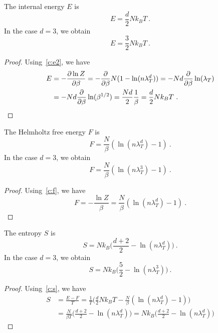     The internal energy $E$ is 
    \begin{equation*}
        E = \frac{d}{2} N k_B T ~.
    \end{equation*}
    In the case $d=3$, we obtain 
    \begin{equation*}
        E = \frac{3}{2} N k_B T ~.
    \end{equation*}
    \begin{proof}
        Using~\eqref{c:e2}, we have
        \begin{equation*}
        \begin{aligned}
            E & = - \frac{\partial\ln Z}{\partial\beta}  = - \frac{\partial}{\partial\beta} N (1 - \ln (n \lambda_T^d)) = - Nd \frac{\partial}{\partial\beta} \ln (\lambda_T) \\ & = - Nd \frac{\partial}{\partial\beta} \ln (\beta^{1/2}) = \frac{Nd}{2} \frac{1}{\beta} = \frac{d}{2} N k_B T ~.
        \end{aligned}
        \end{equation*}
    \end{proof}
    The Helmholtz free energy $F$ is 
    \begin{equation*}
        F = \frac{N}{\beta} (\ln (n \lambda_T^d) - 1) ~.
    \end{equation*}
    In the case $d=3$, we obtain 
    \begin{equation*}
        F = \frac{N}{\beta} (\ln (n \lambda_T^3) - 1) ~.
    \end{equation*}
    \begin{proof}
        Using~\eqref{c:f}, we have
        \begin{equation*}
            F = - \frac{\ln Z}{\beta} = \frac{N}{\beta} (\ln (n \lambda_T^d) - 1) ~.
        \end{equation*}
    \end{proof}
    The entropy $S$ is 
    \begin{equation*}
        S = N k_B \Big ( \frac{d+2}{2} - \ln (n \lambda_T^d) \Big ) ~.
    \end{equation*}
    In the case $d=3$, we obtain 
    \begin{equation*}
        S = N k_B \Big ( \frac{5}{2} - \ln (n \lambda_T^3) \Big ) ~.
    \end{equation*}
    \begin{proof}
        Using~\eqref{c:s}, we have
        \begin{equation*}
        \begin{aligned}
            S & = \frac{E - F}{T} = \frac{1}{T} \Big ( \frac{d}{2} N k_B T - \frac{N}{\beta} (\ln (n \lambda_T^d) - 1) \Big ) \\ & = \frac{N}{\beta T} \Big ( \frac{d+2}{2} - \ln (n \lambda_T^d) \Big )  = N k_B \Big ( \frac{d+2}{2} - \ln (n \lambda_T^d) \Big )
        \end{aligned}
        \end{equation*}
    \end{proof}
